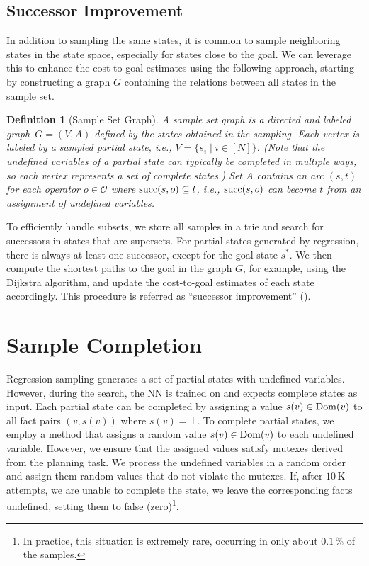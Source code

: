 \documentclass[ppgc,diss,english]{iiufrgs}
\newtheorem{definition}{Definition}
\begin{document}
\subsection{Successor Improvement}
\label{sec:sample-sui}
In addition to sampling the same states, it is common to sample neighboring states in the state space, especially for states close to the goal. We can leverage this to enhance the cost-to-goal estimates using the following approach, starting by constructing a graph $G$ containing the relations between all states in the sample set.
\begin{definition}[Sample Set Graph]\label{def:graph}
A sample set graph is a directed and labeled graph~$G = (V, A)$ defined by the states obtained in the sampling. Each vertex is labeled by a sampled partial state, i.e., $V = \{s_i \mid i \in [N]\}$. (Note that the undefined variables of a partial state can typically be completed in multiple ways, so each vertex represents a set of complete states.) Set $A$ contains an arc $(s,t)$ for each operator $o \in \mathcal{O}$ where $\operatorname{succ}(s,o) \subseteq t$, i.e., $\operatorname{succ}(s,o)$ can become $t$ from an assignment of undefined variables.
\end{definition}
To efficiently handle subsets, we store all samples in a trie and search for successors in states that are supersets. For partial states generated by regression, there is always at least one successor, except for the goal state $s^*$. We then compute the shortest paths to the goal in the graph $G$, for example, using the Dijkstra algorithm, and update the cost-to-goal estimates of each state accordingly. This procedure is referred as ``successor improvement'' (\sui).


\section{Sample Completion}
\label{sec:sample-completion}

Regression sampling generates a set of partial states with undefined variables. However, during the search, the NN is trained on and expects complete states as input.
Each partial state can be completed by assigning a value $s(v)\in\operatorname{Dom}(v)$ to all fact pairs $(v,s(v))$ where $s(v)=\bot$.
To complete partial states, we employ a method that assigns a random value $s(v) \in \operatorname{Dom}(v)$ to each undefined variable. However, we ensure that the assigned values satisfy mutexes derived from the planning task. We process the undefined variables in a random order and assign them random values that do not violate the mutexes. If, after $10$\,K attempts, we are unable to complete the state, we leave the corresponding facts undefined, setting them to false (zero)\footnote{In practice, this situation is extremely rare, occurring in only about $0.1\,\%$ of the samples.}.
\end{document}

